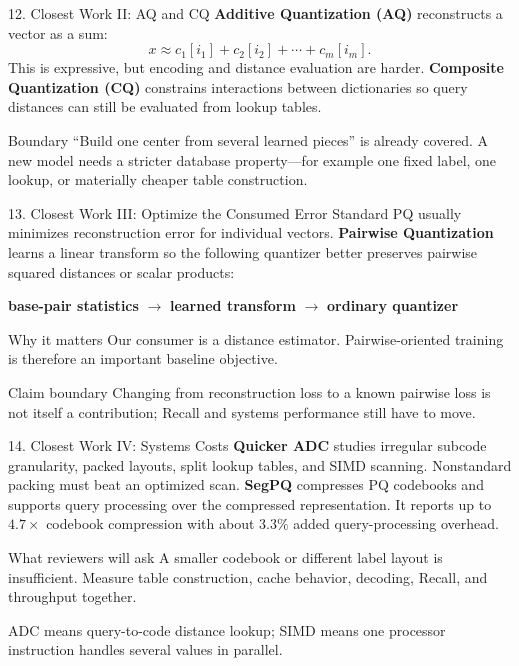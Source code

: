 \documentclass[aspectratio=169]{beamer}
\newcommand{\paper}[1]{\textbf{#1}}
\newcommand{\plain}[1]{\textcolor{blue!65!black}{\textbf{#1}}}
\begin{document}
\begin{frame}{12. Closest Work II: AQ and CQ}
\paper{Additive Quantization (AQ)} reconstructs a vector as a sum:
\[
  x \approx c_1[i_1]+c_2[i_2]+\cdots+c_m[i_m].
\]
This is expressive, but encoding and distance evaluation are harder.
\medskip
\paper{Composite Quantization (CQ)} constrains interactions between dictionaries so query distances can still be evaluated from lookup tables.
\begin{alertblock}{Boundary}
``Build one center from several learned pieces'' is already covered. A new model needs a stricter database property---for example one fixed label, one lookup, or materially cheaper table construction.
\end{alertblock}
\end{frame}

\begin{frame}{13. Closest Work III: Optimize the Consumed Error}
Standard PQ usually minimizes reconstruction error for individual vectors.
\medskip
\paper{Pairwise Quantization} learns a linear transform so the following quantizer better preserves pairwise squared distances or scalar products:
\begin{center}
\plain{base-pair statistics} $\rightarrow$ \plain{learned transform} $\rightarrow$ \plain{ordinary quantizer}
\end{center}
\begin{block}{Why it matters}
Our consumer is a distance estimator. Pairwise-oriented training is therefore an important baseline objective.
\end{block}
\begin{alertblock}{Claim boundary}
Changing from reconstruction loss to a known pairwise loss is not itself a contribution; Recall and systems performance still have to move.
\end{alertblock}
\end{frame}

\begin{frame}{14. Closest Work IV: Systems Costs}
\paper{Quicker ADC} studies irregular subcode granularity, packed layouts, split lookup tables, and SIMD scanning. Nonstandard packing must beat an optimized scan.
\medskip
\paper{SegPQ} compresses PQ codebooks and supports query processing over the compressed representation. It reports up to $4.7\times$ codebook compression with about $3.3\%$ added query-processing overhead.
\begin{alertblock}{What reviewers will ask}
A smaller codebook or different label layout is insufficient. Measure table construction, cache behavior, decoding, Recall, and throughput together.
\end{alertblock}
\scriptsize ADC means query-to-code distance lookup; SIMD means one processor instruction handles several values in parallel.
\end{frame}
\end{document}
